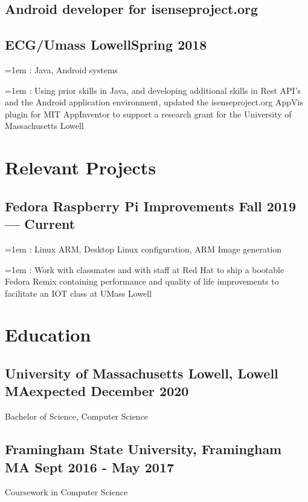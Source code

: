 \documentclass[11pt]{article}
\newcommand\describe[2]{

	\hangindent=1em
	\hangafter=1
	\noindent\hspace{1em}{\it#1}: #2
}
\begin{document}
\subsection{Android developer for isenseproject.org}
\subsection{ECG/Umass Lowell\dotfill Spring 2018}
\describe{Skills Used}{
	Java, Android systems
}
\describe{Roles}{
	Using prior skills in Java, and developing additional skills in
	Rest API's and the Android application environment, 
	updated the isenseproject.org AppVis plugin for MIT AppInventor
	to support a research grant for the University of Massachusetts Lowell
}

\section{Relevant Projects}

\subsection{Fedora Raspberry Pi Improvements \dotfill Fall 2019 --- Current }

\describe{Skills Used}{
	Linux ARM, Desktop Linux configuration, ARM Image generation
}
\describe{Roles}{
	Work with classmates
	and with staff at Red Hat
	to ship a bootable Fedora Remix containing performance
	and quality of life improvements
	to facilitate an IOT class at UMass Lowell
}

\section{Education}

\subsection{University of Massachusetts Lowell, Lowell MA\dotfill expected December 2020}
{\hspace{-1em} Bachelor of Science, Computer Science}

\subsection{Framingham State University, Framingham MA
\dotfill Sept 2016 - May 2017} 
{\hspace{-1em} Coursework in Computer Science}
\end{document}
